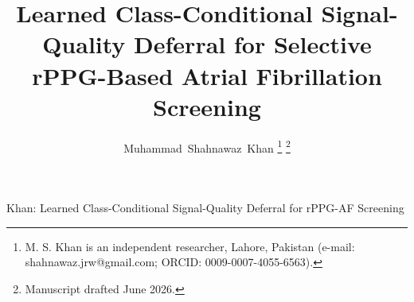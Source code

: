 \documentclass[journal]{IEEEtran}
\begin{document}
\title{Learned Class-Conditional Signal-Quality Deferral for Selective rPPG-Based Atrial Fibrillation Screening}

\author{Muhammad~Shahnawaz~Khan%
\thanks{M. S. Khan is an independent researcher, Lahore, Pakistan
        (e-mail: shahnawaz.jrw@gmail.com; ORCID: 0009-0007-4055-6563).}%
\thanks{Manuscript drafted June 2026.}}

%
{Khan: Learned Class-Conditional Signal-Quality Deferral for rPPG-AF Screening}

\maketitle

\begin{abstract}

\end{abstract}
\end{document}
